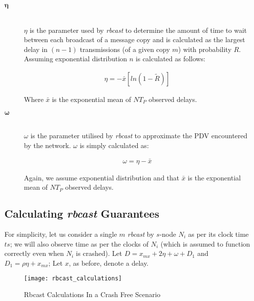 \begin{description}
        \item[\Huge$\boldsymbol{\eta}$] \hfill \\
        $\eta$ is the parameter used by \emph{rbcast} to determine the amount of time to wait between each broadcast of a message copy and is calculated as the largest delay in $(n - 1)$ transmissions (of a given copy $m$) with probability $R$.  Assuming exponential distribution $n$ is calculated as follows:
        
        \begin{equation}
            \begin{aligned}
                \eta=-\bar{x}[ln(1-\tilde{R})]  
            \end{aligned}
        \end{equation}
        
Where $\bar{x}$ is the exponential mean of $NT_P$ observed delays.

        \item[\Huge$\boldsymbol{\omega}$] \hfill \\
        $\omega$ is the parameter utilised by \emph{rbcast} to approximate the PDV encountered by the network.  $\omega$ is simply calculated as:
        
        \begin{equation}
            \begin{aligned}
                \omega = \eta - \bar{x}
            \end{aligned}
        \end{equation}        
        
        Again, we assume exponential distribution and that $\bar{x}$ is the exponential mean of $NT_P$ observed delays.
        \end{description}

        \subsection*{Calculating \emph{rbcast} Guarantees}
        For simplicity, let us consider a single $m$ \emph{rbcast} by $s$-node $N_i$ as per its clock time $ts$; we will also observe time as per the clocks of $N_i$ (which is assumed to function correctly even when $N_i$ is crashed).  Let $D = x_{mx} + 2\eta + \omega + D_1$ and $D_1 = \rho\eta + x_{mx}$; Let $x$, as before, denote a delay.  

        \begin{figure}[hb]
                \centering    
                \centerline{\texttt{[image: rbcast\_calculations]}}
                \caption[Rbcast Calculations Diagram In a Crash Free Scenario]{Rbcast Calculations In a Crash Free Scenario}
                \label{fig:rbcast_calc}
            \end{figure}    

